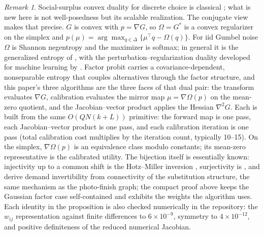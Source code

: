 \documentclass[12pt]{article}
\theoremstyle{remark}
\newtheorem{remark}{Remark}
\begin{document}
\begin{remark}
Social-surplus convex duality for discrete choice is classical
\citep{chiong2016,norets2013}; what is new here is not well-posedness but its
scalable realization. The conjugate view makes that precise. $G$ is
convex with $p = \nabla G$, so $\Omega = G^*$ is a convex regularizer on
the simplex and $p(\mu) = \arg\max_{q \in \Delta}\{\mu^\top q -
\Omega(q)\}$. For iid Gumbel noise $\Omega$ is Shannon negentropy and
the maximizer is softmax; in general it is the generalized entropy of
\citet{fosgerau2020}, with the perturbation--regularization duality
developed for machine learning by \citet{berthet2020}. Factor probit
carries a covariance-dependent, nonseparable entropy that couples
alternatives through the factor structure, and this paper's three
algorithms are the three faces of that dual pair: the transform
evaluates $\nabla G$, calibration evaluates the mirror map $\mu =
\nabla\Omega(p)$ on the mean-zero quotient, and the Jacobian--vector
product applies the Hessian $\nabla^2 G$. Each is built from the same
$O(QN(k+L))$ primitive: the forward map is one pass, each
Jacobian--vector product is one pass, and each calibration iteration is
one pass (total calibration cost multiplies by the iteration count,
typically 10--15). On the simplex, $\nabla\Omega(p)$ is an equivalence
class modulo constants; its mean-zero representative is the calibrated
utility. The bijection itself is essentially known:
injectivity up to a common shift is the Hotz--Miller inversion
\citep{hotz1993}, surjectivity is \citet{norets2013}, and
\citet{bgh2013} derive demand invertibility from
connectivity of the substitution structure, the same mechanism as the
photo-finish graph; the compact proof above keeps the Gaussian factor
case self-contained and exhibits the weights the algorithm uses. Each
identity in the proposition is also checked
numerically in the repository: the $w_{ij}$ representation against finite
differences to $6\times10^{-9}$, symmetry to $4\times10^{-12}$, and
positive definiteness of the reduced numerical Jacobian.
\end{remark}
\end{document}
